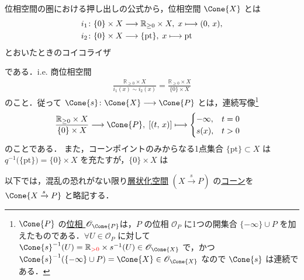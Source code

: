 \documentclass[TQFT_main]{subfiles}
\begin{document}
位相空間の圏における押し出しの公式から，位相空間 $\Cone{X}$ とは
\begin{align}
    i_1 \colon \{0\} \times X &\longrightarrow \mathbb{R}_{\ge 0} \times X,\; x \longmapsto (0,\, x), \\
    i_2 \colon \{0\} \times X &\longrightarrow \{\mathrm{pt}\},\; x \longmapsto \mathrm{pt}
\end{align}
とおいたときのコイコライザ
\begin{center}
\end{center}
である．i.e. 商位相空間
\begin{align}
    \frac{\mathbb{R}_{\ge 0} \times X}{i_1 (x) \sim i_2 (x)} = \frac{\mathbb{R}_{\ge 0} \times X}{\{0\} \times X}
\end{align}
のこと．従って $\Cone{s} \colon \Cone{X} \lto \Cone{P}$ とは，連続写像\footnote{$\Cone{P}$ の\hyperref[def:topo-poset]{位相 $\mathscr{O}_{\Cone{P}}$}は，$P$ の位相 $\mathscr{O}_{P}$ に1つの開集合 $\{-\infty\} \cup P$ を加えたものである．$\forall U \in \mathscr{O}_{P}$ に対して $\Cone{s}^{-1} (U) = \mathbb{R}_{\textcolor{red}{>0}} \times s^{-1}(U) \in \mathscr{O}_{\Cone{X}}$ で，かつ $\Cone{s}^{-1}(\{-\infty\} \cup P) = \Cone{X} \in \mathscr{O}_{\Cone{X}}$ なので $\Cone{s}$ は連続である．}
\begin{align}
    \frac{\mathbb{R}_{\ge 0} \times X}{\{0\} \times X} &\lto \Cone{P},\;
    [(t,\, x)] \lmto \begin{cases}
        -\infty, &t = 0 \\
        s(x), &t > 0
    \end{cases}
\end{align}
のことである．
また，コーンポイントのみからなる1点集合 $\{\mathrm{pt}\} \subset X$ は $q^{-1} \bigl( \{\mathrm{pt}\} \bigr) = \{0\} \times X$ を充たすが，$\{0\} \times X$ は 

\begin{marker}
    以下では，混乱の恐れがない限り\hyperref[def:stratified-space]{層状化空間} $(X \xrightarrow{s} P)$ の\hyperref[def:str-cone]{コーン}を $\Cone{X \xrightarrow{s} P}$ と略記する．
\end{marker}
\end{document}
